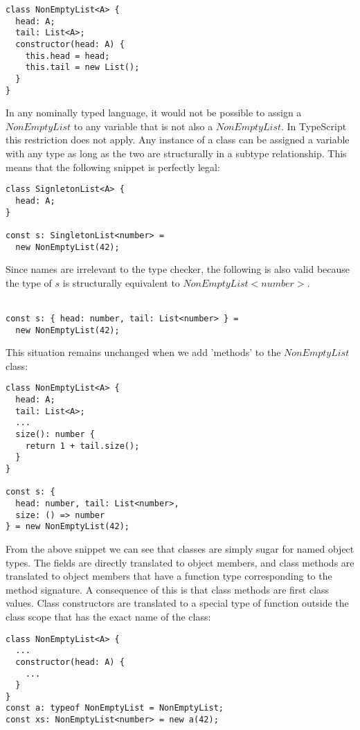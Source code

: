 \begin{lstlisting}
class NonEmptyList<A> {
  head: A;
  tail: List<A>;
  constructor(head: A) {
    this.head = head;
    this.tail = new List();
  }
}
\end{lstlisting}

In any nominally typed language, it would not be possible to assign a $NonEmptyList$ to any variable that is not also a $NonEmptyList$.
In TypeScript this restriction does not apply. 
Any instance of a class can be assigned a variable with any type as long as the two are structurally in a subtype relationship.
This means that the following snippet is perfectly legal:

\begin{lstlisting}
class SignletonList<A> {
  head: A;
}

const s: SingletonList<number> = 
  new NonEmptyList(42);
\end{lstlisting}

Since names are irrelevant to the type checker, the following is also valid because the type of 
$s$ is structurally equivalent to $NonEmptyList<number>$.
\\
\\
\begin{lstlisting}
const s: { head: number, tail: List<number> } =
  new NonEmptyList(42);
\end{lstlisting}

This situation remains unchanged when we add 'methods' to the $NonEmptyList$ class:

\begin{lstlisting}
class NonEmptyList<A> {
  head: A;
  tail: List<A>;
  ...
  size(): number {
    return 1 + tail.size();
  }
}

const s: { 
  head: number, tail: List<number>,
  size: () => number  
} = new NonEmptyList(42);
\end{lstlisting}

From the above snippet we can see that classes are simply sugar for named object types.
The fields are directly translated to object members, and class methods are translated
to object members that have a function type corresponding to the method signature.
A consequence of this is that class methods are first class values.
Class constructors are translated to a special type of function outside the class scope that has the exact name of the class:

\begin{lstlisting}
class NonEmptyList<A> {
  ...
  constructor(head: A) {
    ...
  }
}
const a: typeof NonEmptyList = NonEmptyList;
const xs: NonEmptyList<number> = new a(42);
\end{lstlisting}

